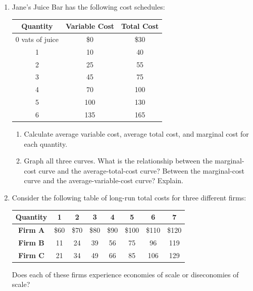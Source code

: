 \documentclass{article}
\begin{document}
\begin{enumerate}
\begin{enumerate}
	\item Which of these same four curves would shift as a result of the per-burger tax? Why? Show this in a new graph. Label the graph as precisely as possible.
	
	\end{enumerate}
	
\item Jane's Juice Bar has the following cost schedules:

	\begin{center}
	\begin{tabular}{c | c | c}
	\textbf{Quantity} & \textbf{Variable Cost} & \textbf{Total Cost} \\
	\hline
	0 vats of juice & \$0 & \$30 \\
	1 & 10 & 40 \\
	2 & 25 & 55 \\
	3 & 45 & 75 \\
	4 & 70 & 100 \\
	5 & 100 & 130 \\
	6 & 135 & 165
	\end{tabular}
	\end{center}
	
	\begin{enumerate}
	
	\item Calculate average variable cost, average total cost, and marginal cost for each quantity.
	
	\item Graph all three curves. What is the relationship between the marginal-cost curve and the average-total-cost curve? Between the marginal-cost curve and the average-variable-cost curve? Explain.
	
	\end{enumerate}
	
\item Consider the following table of long-run total costs for three different firms:

	\begin{center}
	\begin{tabular}{| c | c | c | c | c | c | c | c |}
	\hline
	\textbf{Quantity} & 1 & 2 & 3 & 4 & 5 & 6 & 7 \\
	\hline
	\textbf{Firm A} & \$60 & \$70 & \$80 & \$90 & \$100 & \$110 & \$120 \\
	\hline
	\textbf{Firm B} & 11 & 24 & 39 & 56 & 75 & 96 & 119 \\
	\hline
	\textbf{Firm C} & 21 & 34 & 49 & 66 & 85 & 106 & 129 \\
	\hline
	\end{tabular}
	\end{center}
	
	Does each of these firms experience economies of scale or diseconomies of scale?

\end{enumerate}
\end{document}
